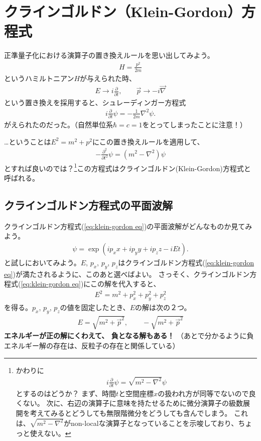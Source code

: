 \documentclass[10pt,a4paper]{jarticle}
\begin{document}
\section{クラインゴルドン（Klein-Gordon）方程式}
正準量子化における演算子の置き換えルールを思い出してみよう。
\begin{align}
H = \frac{p^2}{2m}
\end{align}
というハミルトニアン$H$が与えられた時、
\begin{align}
E \to i\frac{\partial}{\partial t}, \qquad
\vec p \to -i \vec \nabla
\end{align}
という置き換えを採用すると、シュレーディンガー方程式
\begin{align}
i\frac{\partial}{\partial t} \psi =  -\frac{1}{2m} \nabla^2 \psi .
\end{align}
がえられたのだった。（自然単位系$\hbar = c =1$をとってしまったことに注意！）

…ということは$E^2 = m^2 + p^2$にこの置き換えルールを適用して、
\begin{align}
-\frac{\partial^2}{\partial t^2} \psi = (m^2 - \nabla^2)\psi \label{eq:klein-gordon eq}
\end{align}
とすれば良いのでは？\footnote{
かわりに
\begin{align}
i\frac{\partial}{\partial t} \psi = \sqrt{m^2 - \nabla^2} \psi
\end{align}
とするのはどうか？
まず、時間$t$と空間座標$x$の扱われ方が同等でないので良くない。
次に、右辺の演算子に意味を持たせるために微分演算子の級数展開を考えてみるとどうしても無限階微分をどうしても含んでしまう。
これは、$\sqrt{m^2 - \nabla^2}$がnon-localな演算子となっていることを示唆しており、ちょっと使えない。
}この方程式はクラインゴルドン(Klein-Gordon)方程式と呼ばれる。


\subsection{クラインゴルドン方程式の平面波解}
クラインゴルドン方程式(\ref{eq:klein-gordon eq})の平面波解がどんなものか見てみよう。
\begin{align}
\psi = \exp\left( i p_x x + i p_y y + i p_z z - i E t \right).
\end{align}
と試しにおいてみよう。$E$, $p_x$, $p_y$, $p_z$はクラインゴルドン方程式(\ref{eq:klein-gordon eq})が満たされるように、このあと選べばよい。
さっそく、クラインゴルドン方程式(\ref{eq:klein-gordon eq})にこの解を代入すると、
\begin{align}
E^2 = m^2 + p_x^2 + p_y^2 + p_z^2
\end{align}
を得る。$p_x$, $p_y$, $p_z$の値を固定したとき、$E$の解は次の２つ。
\begin{align}
E = \sqrt{m^2 + \vec p^2} , \qquad -\sqrt{m^2 + \vec p^2}
\end{align}
\textbf{エネルギーが正の解にくわえて、 負となる解もある！}
（あとで分かるように負エネルギー解の存在は、反粒子の存在と関係している）
\end{document}
